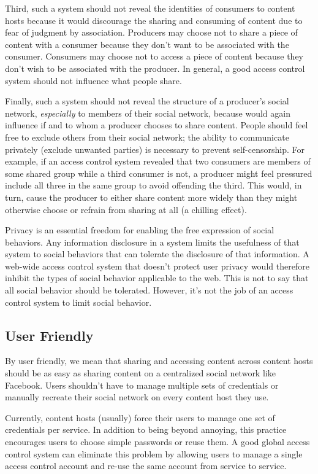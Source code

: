 \documentclass[pdftex,12pt,a4papaer,twoside,notitlepage]{report}
\begin{document}
Third, such a system should not reveal the identities of consumers to content
hosts because it would discourage the sharing and consuming of content due to
fear of judgment by association. Producers may choose not to share a piece of
content with a consumer because they don't want to be associated with the
consumer. Consumers may choose not to access a piece of content because they
don't wish to be associated with the producer. In general, a good access
control system should not influence what people share.

Finally, such a system should not reveal the structure of a producer's social
network, \emph{especially} to members of their social network, because would
again influence if and to whom a producer chooses to share content. People
should feel free to exclude others from their social network; the ability to
communicate privately (exclude unwanted parties) is necessary to prevent
self-censorship. For example, if an access control system revealed that two
consumers are members of some shared group while a third consumer is not, a
producer might feel pressured include all three in the same group to avoid
offending the third. This would, in turn, cause the producer to either share
content more widely than they might otherwise choose or refrain from sharing at
all (a chilling effect).

Privacy is an essential freedom for enabling the free expression of social
behaviors. Any information disclosure in a system limits the usefulness of that
system to social behaviors that can tolerate the disclosure of that information.
A web-wide access control system that doesn't protect user privacy would
therefore inhibit the types of social behavior applicable to the web. This is
not to say that all social behavior should be tolerated. However, it's not the
job of an access control system to limit social behavior.

\subsection{User Friendly}
\label{sub:goal-user}

By user friendly, we mean that sharing and accessing content across content
hosts should be as easy as sharing content on a centralized social network like
Facebook. Users shouldn't have to manage multiple sets of credentials or
manually recreate their social network on every content host they use.

Currently, content hosts (usually) force their users to manage one set of
credentials per service. In addition to being beyond annoying, this practice
encourages users to choose simple passwords or reuse them. A good global access
control system can eliminate this problem by allowing users to manage a single
access control account and re-use the same account from service to service.
\end{document}
